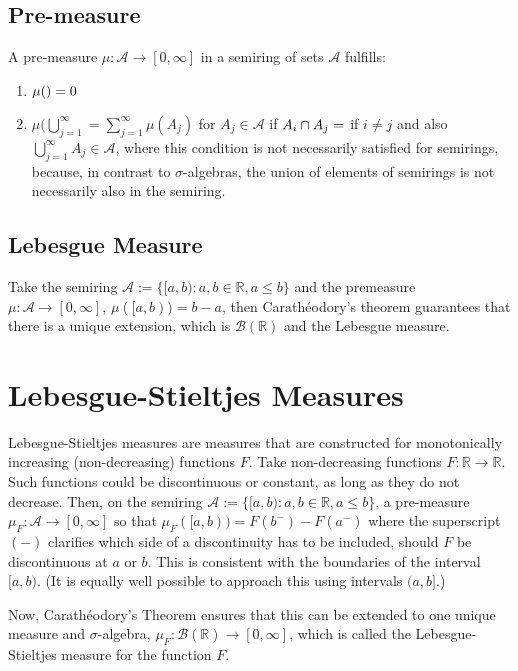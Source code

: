 \subsection{Pre-measure}
A pre-measure $\mu : \mathscr{A} \rightarrow [0,\infty]$ in a semiring of sets $\mathscr{A}$ fulfills:

\begin{enumerate}
\item $\mu(\empty) = 0$
\item $\mu(\bigcup_{j=1}^{\infty} = \sum_{j=1}^{\infty} \mu(A_j)$ for $A_j \in \mathscr{A}$ if $A_i \cap A_j = \empty$ if $i\neq j$ and also $\bigcup_{j=1}^{\infty} A_j \in \mathscr{A}$, where this condition is not necessarily satisfied for semirings, because, in contrast to $\sigma$-algebras, the union of elements of semirings is not necessarily also in the semiring.
\end{enumerate} 

\subsection{Lebesgue Measure}
Take the semiring $\mathscr{A} := \{ [a,b) : a,b \in \mathbb{R}, a\leq b \}$ and the premeasure $\mu : \mathscr{A} \rightarrow [0,\infty]$, $\mu([a,b)) = b-a$, then Carath\'eodory's theorem guarantees that there is a unique extension, which is $\mathscr{B}(\mathbb{R})$ and the Lebesgue measure. 


\section{Lebesgue-Stieltjes Measures}
Lebesgue-Stieltjes measures are measures that are constructed for monotonically increasing (non-decreasing) functions $F$. Take non-decreasing functions $F:\mathbb{R} \rightarrow \mathbb{R}$. Such functions could be discontinuous or constant, as long as they do not decrease. Then, on the semiring $\mathscr{A} := \{ [a,b) : a,b \in \mathbb{R}, a\leq b \}$, a pre-measure $\mu_F : \mathscr{A} \rightarrow [0,\infty]$ so that $\mu_F([a,b)) = F(b^-) - F(a^-)$ where the superscript $(-)$ clarifies which side of a discontinuity has to be included, should $F$ be discontinuous at $a$ or $b$. This is consistent with the boundaries of the interval $[a,b)$. (It is equally well possible to approach this using intervals $(a,b]$.)

Now, Carath\'eodory's Theorem ensures that this can be extended to one unique measure and $\sigma$-algebra, $\mu_F : \mathscr{B}(\mathbb{R}) \rightarrow [0,\infty]$, which is called the Lebesgue-Stieltjes measure for the function $F$. 

